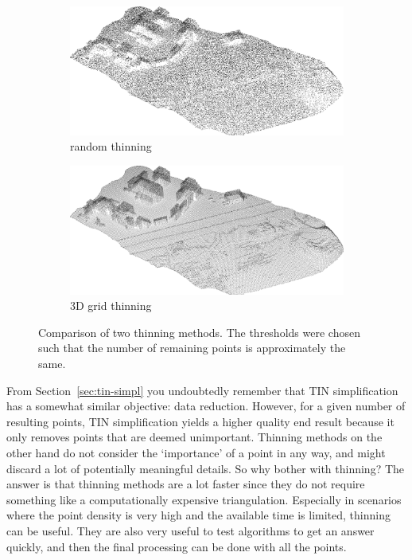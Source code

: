 \begin{figure}
  \centering
  \begin{subfigure}[b]{0.45\linewidth}
    \centering
    \includegraphics[width=\textwidth]{rand01.png}
    \caption{random thinning}
  \end{subfigure}
  \begin{subfigure}[b]{0.45\linewidth}
    \centering
    \includegraphics[width=\textwidth]{voxel08m.png}
    \caption{3D grid thinning}
  \end{subfigure}
\caption{Comparison of two thinning methods. The thresholds were chosen such that the number of remaining points is approximately the same.}%
\label{fig:randvsgrid}
\end{figure}

From Section~\ref{sec:tin-simpl} you undoubtedly remember that TIN simplification has a somewhat similar objective: data reduction. 
However, for a given number of resulting points, TIN simplification yields a higher quality end result because it only removes points that are deemed unimportant.
Thinning methods on the other hand do not consider the `importance' of a point in any way, and might discard a lot of potentially meaningful details.
So why bother with thinning? The answer is that thinning methods are a lot faster since they do not require something like a computationally expensive triangulation.
Especially in scenarios where the point density is very high and the available time is limited, thinning can be useful.
They are also very useful to test algorithms to get an answer quickly, and then the final processing can be done with all the points.


